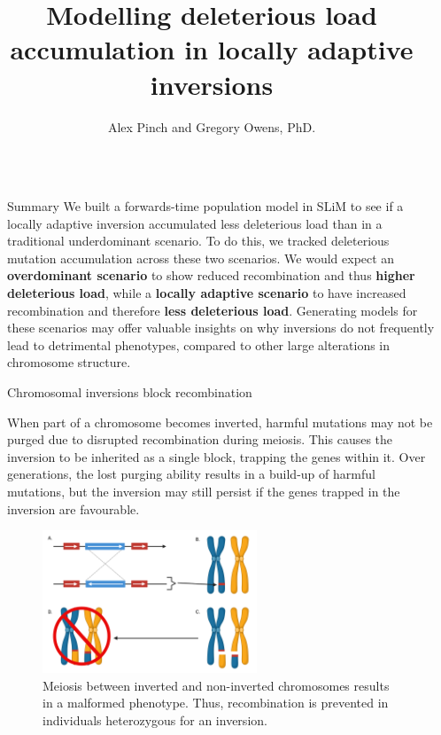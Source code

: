 \documentclass[final]{beamer}
\title{Modelling deleterious load accumulation in locally adaptive inversions}
\author{Alex Pinch and Gregory Owens, PhD.}
\institute[shortinst]{Department of Biology, University of Victoria}
\newlength{\sepwidth}
\newlength{\colwidth}
\newcommand{\separatorcolumn}{\begin{column}{\sepwidth}\end{column}}
\begin{document}
\begin{frame}[t]
\begin{columns}[t]
\separatorcolumn

\begin{column}{\colwidth}

\begin{alertblock}{Summary}
We built a forwards-time population model in SLiM to see if a locally adaptive inversion accumulated less deleterious load than in a traditional underdominant scenario. To do this, we tracked deleterious mutation accumulation across these two scenarios. We would expect an \textbf{overdominant scenario} to show reduced recombination and thus \textbf{higher deleterious load}, while a \textbf{locally adaptive scenario} to have increased recombination and therefore \textbf{less deleterious load}. Generating models for these scenarios may offer valuable insights on why inversions do not frequently lead to detrimental phenotypes, compared to other large alterations in chromosome structure.
\end{alertblock}

  \begin{block}{Chromosomal inversions block recombination}

    When part of a chromosome becomes inverted, harmful mutations may not be purged due to disrupted recombination during meiosis. This causes the inversion to be inherited as a single block, trapping the genes within it. Over generations, the lost purging ability results in a build-up of harmful mutations, but the inversion may still persist if the genes trapped in the inversion are favourable.

    \begin{figure}
      \centering
    \includegraphics[width=0.6\textwidth]{images/chromosome.png}
    \caption{Meiosis between inverted and non-inverted chromosomes results in a malformed phenotype. Thus, recombination is prevented in individuals heterozygous for an inversion.}
    \end{figure}


\end{block}
\end{column}
\end{columns}
\end{frame}
\end{document}
